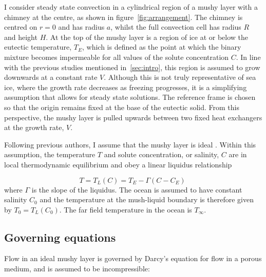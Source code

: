 \documentclass[11pt,twocolumn]{article}
\begin{document}
I consider steady state convection in a cylindrical region of a mushy layer with a chimney at the centre, as shown in figure~\ref{fig:arrangement}. The chimney is centred on $r=0$ and has radius $a$, whilst the full convection cell has radius $R$ and height $H$. At the top of the mushy layer is a region of ice at or below the eutectic temperature, $T_E$, which is defined as the point at which the binary mixture becomes impermeable for all values of the solute concentration $C$. In line with the previous studies mentioned in~\autoref{sec:intro}, this region is assumed to grow downwards at a constant rate $V$. Although this is not truly representative of sea ice, where the growth rate decreases as freezing progresses, it is a simplifying assumption that allows for steady state solutions. The reference frame is chosen so that the origin remains fixed at the base of the eutectic solid. From this perspective, the mushy layer is pulled upwards between two fixed heat exchangers at the growth rate, $V$.

Following previous authors, I assume that the mushy layer is ideal \citep*{worster-97}. Within this assumption, the temperature $T$ and solute concentration, or salinity, $C$ are in local thermodynamic equilibrium and obey a linear liquidus relationship

\begin{equation}
\label{eq:liquidus}
T = T_L(C) = T_E  - \Gamma (C-C_E) \;
\end{equation}
where $\Gamma$ is the slope of the liquidus. The ocean is assumed to have constant salinity $C_0$ and the temperature at the mush-liquid boundary is therefore given by $T_0 = T_L(C_0)$. The far field temperature in the ocean is $T_\infty$.

\subsection{Governing equations}
Flow in an ideal mushy layer is governed by Darcy's equation for flow in a porous medium, and is assumed to be incompressible:
\end{document}
